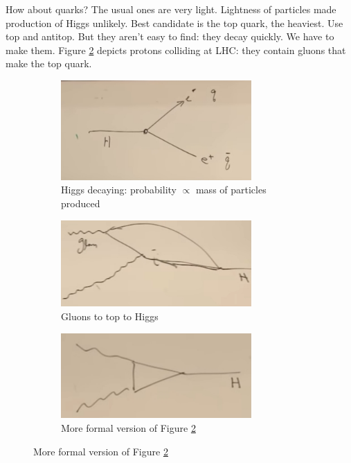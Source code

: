 \documentclass[]{article}
\begin{document}
How about quarks? The usual ones are very light. Lightness of particles made production of Higgs unlikely. Best candidate is the top quark, the heaviest. Use top and antitop. But they aren't easy to find: they decay quickly. We have to make them. Figure \ref{fig:2-a3-gluons} depicts protons colliding at LHC: they contain gluons that make the top quark. 

\begin{figure}[H]
	\caption{How to make a Higgs}
	\begin{subfigure}[t]{0.3\textwidth}
		\caption{Higgs decaying: probability $\propto$ mass of particles produced}\label{fig:2-a3-higgs-decay}
		\includegraphics[width=0.8\textwidth]{2-a3-higgs-decay}
	\end{subfigure}
	\begin{subfigure}[t]{0.3\textwidth}
		\caption{Gluons to top to Higgs}\label{fig:2-a3-gluons}
		\includegraphics[width=0.8\textwidth]{2-a3-gluons}
	\end{subfigure}
	\begin{subfigure}[t]{0.3\textwidth}
		\caption{More formal version of Figure \ref{fig:2-a3-gluons} }\label{fig:2-a3-higgs-neat}
		\includegraphics[width=0.8\textwidth]{2-a3-higgs-neat}
	\end{subfigure}
\end{figure}
\end{document}
